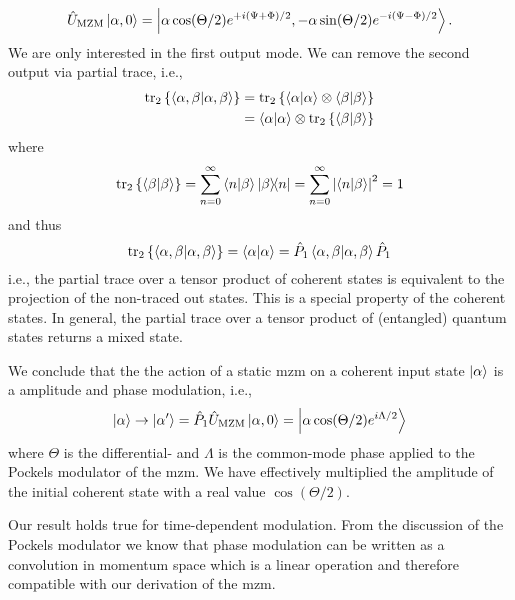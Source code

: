\begin{equation}
	\hat{U}_\text{MZM}
	\ket{\alpha,0}
	=
	\ket{\alpha\cos(\Theta/2)e^{+i(\Psi+\Phi)/2},-\alpha\sin(\Theta/2)e^{-i(\Psi-\Phi)/2}}
	.
\end{equation}
We are only interested in the first output mode.
We can remove the second output via partial trace, i.e.,
\begin{equation}
	\begin{split}
		\tr_2\left\{
			\braket{\alpha,\beta}
		\right\}
		&=
		\tr_2\left\{
			\braket{\alpha}
			\otimes
			\braket{\beta}
		\right\}
		\\
		&=
		\braket{\alpha}
		\otimes
		\tr_2\left\{
			\braket{\beta}
		\right\}
	\end{split}
\end{equation}
where
\begin{equation}
	\tr_2\left\{
		\braket{\beta}
	\right\}
	=
	\sum_{n=0}^\infty
	\braket{n}{\beta}
	\ketbra{\beta}{n}
	=
	\sum_{n=0}^\infty
	\abs{\braket{n}{\beta}}^2
	=
	1
\end{equation}
and thus
\begin{equation}
	\tr_2\left\{
		\braket{\alpha,\beta}
	\right\}
	=
	\braket{\alpha}
	=
	\hat{P}_1
	\braket{\alpha,\beta}
	\hat{P}_1
\end{equation}
i.e., the partial trace over a tensor product of coherent states is equivalent to the projection of the non-traced out states.
This is a special property of the coherent states.
In general, the partial trace over a tensor product of (entangled) quantum states returns a mixed state.

We conclude that the the action of a static \gls{mzm} on a coherent input state $\ket{\alpha}$ is a amplitude and phase modulation, i.e.,
\begin{equation}
	\ket{\alpha}
	\to
	\ket{\alpha^\prime}
	=
	\hat{P}_1
	\hat{U}_\text{MZM}
	\ket{\alpha,0}
	=
	\ket{\alpha\cos(\Theta/2)e^{i\Lambda/2}}
	\label{eq:mzm_transform}
\end{equation}
where $\Theta$ is the differential- and $\Lambda$ is the common-mode phase applied to the Pockels modulator of the \gls{mzm}.
We have effectively multiplied the amplitude of the initial coherent state with a real value $\cos(\Theta/2)$.

Our result holds true for time-dependent modulation.
From the discussion of the Pockels modulator we know that phase modulation can be written as a convolution in momentum space which is a linear operation and therefore compatible with our derivation of the \gls{mzm}.

